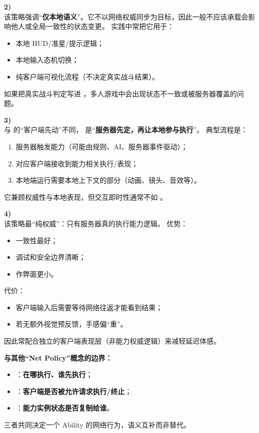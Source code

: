 \documentclass[10pt,CJKmath]{ctexart}
\begin{document}
\textbf{2) }\\
该策略强调“\textbf{仅本地语义}”。它不以网络权威同步为目标，因此一般不应该承载会影响他人或全局一致性的状态变更。  
实践中常把它用于：
\begin{itemize}
	\item 本地 HUD/准星/提示逻辑；
	\item 本地输入态机切换；
	\item 纯客户端可视化流程（不决定真实战斗结果）。
\end{itemize}
如果把真实战斗判定写进 ，多人游戏中会出现状态不一致或被服务器覆盖的问题。

\textbf{3) }\\
与  的“客户端先动”不同， 是“\textbf{服务器先定，再让本地参与执行}”。  
典型流程是：
\begin{enumerate}
	\item 服务器触发能力（可能由规则、AI、服务器事件驱动）；
	\item 对应客户端接收到能力相关执行/表现；
	\item 本地端运行需要本地上下文的部分（动画、镜头、音效等）。
\end{enumerate}
它兼顾权威性与本地表现，但交互即时性通常不如 。

\textbf{4) }\\
该策略最“纯权威”：只有服务器真的执行能力逻辑。  
优势：
\begin{itemize}
	\item 一致性最好；
	\item 调试和安全边界清晰；
	\item 作弊面更小。
\end{itemize}
代价：
\begin{itemize}
	\item 客户端输入后需要等待网络往返才能看到结果；
	\item 若无额外视觉预反馈，手感偏“重”。
\end{itemize}
因此常配合独立的客户端表现层（非能力权威逻辑）来减轻延迟体感。

\textbf{与其他“Net Policy”概念的边界：}
\begin{itemize}
	\item {}：\textbf{在哪执行、谁先执行}；
	\item {}：\textbf{客户端是否被允许请求执行/终止}；
	\item {}：\textbf{能力实例状态是否复制给谁}。
\end{itemize}
三者共同决定一个 Ability 的网络行为，语义互补而非替代。
\end{document}

